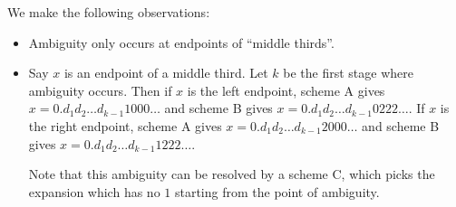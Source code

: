 We make the following observations:
\begin{itemize}
    \item Ambiguity only occurs at endpoints of ``middle thirds''.
    \item Say $x$ is an endpoint of a middle third.
    Let $k$ be the first stage where ambiguity occurs.
    Then if $x$ is the left endpoint, scheme A gives
    $x = 0.d_1d_2\dots d_{k-1}1000\dots$ and scheme B gives
    $x = 0.d_1d_2\dots d_{k-1}0222\dots$.
    If $x$ is the right endpoint, scheme A gives
    $x = 0.d_1d_2\dots d_{k-1}2000\dots$ and scheme B gives
    $x = 0.d_1d_2\dots d_{k-1}1222\dots$.

    Note that this ambiguity can be resolved by a scheme C, which picks
    the expansion which has no $1$ starting from the point of ambiguity.
\end{itemize}

